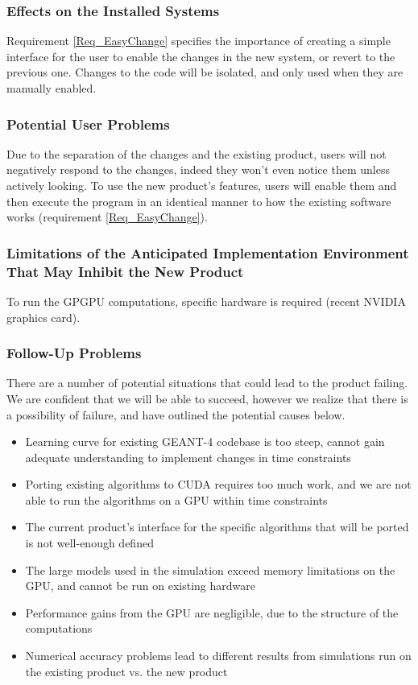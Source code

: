 \documentclass[12pt]{article}
\begin{document}
\subsubsection{Effects on the Installed Systems}
Requirement \ref{Req_EasyChange} specifies the importance of creating a simple interface for the user to enable the changes in the new system, or revert to the previous one. Changes to the code will be isolated, and only used when they are manually enabled.

\subsubsection{Potential User Problems}
Due to the separation of the changes and the existing product, users will not negatively respond to the changes, indeed they won't even notice them unless actively looking. To use the new product's features, users will enable them and then execute the program in an identical manner to how the existing software works (requirement \ref{Req_EasyChange}).

\subsubsection{Limitations of the Anticipated Implementation Environment That May Inhibit the New Product}
To run the GPGPU computations, specific hardware is required (recent NVIDIA graphics card).

\subsubsection{Follow-Up Problems}
There are a number of potential situations that could lead to the product failing. We are confident that we will be able to succeed, however we realize that there is a possibility of failure, and have outlined the potential causes below.
\begin{itemize}
\item Learning curve for existing GEANT-4 codebase is too steep, cannot gain adequate understanding to implement changes in time constraints
\item Porting existing algorithms to CUDA requires too much work, and we are not able to run the algorithms on a GPU within time constraints
\item The current product's interface for the specific algorithms that will be ported is not well-enough defined
\item The large models used in the simulation exceed memory limitations on the GPU, and cannot be run on existing hardware
\item Performance gains from the GPU are negligible, due to the structure of the computations
\item Numerical accuracy problems lead to different results from simulations run on the existing product vs. the new product
\end{itemize}
\end{document}
